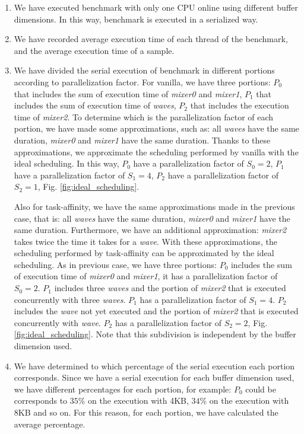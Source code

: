 \begin{enumerate}
\item We have executed benchmark with only one CPU online using different buffer dimensions. In this way, benchmark is executed in a serialized way.
\item We have recorded average execution time of each thread of the benchmark, and the average execution time of a sample.
\item We have divided the serial execution of benchmark in different portions according to parallelization factor. For vanilla, we have three portions: 
$P_{0}$ that includes the sum of execution time of \textit{mixer0} and \textit{mixer1}, $P_{1}$ that includes the sum of execution time of \textit{waves}, 
$P_{2}$ that includes the execution time of \textit{mixer2}. To determine which is the parallelization factor of each portion, we have made some 
approximations, such as: all \textit{waves} have the same duration, \textit{mixer0} and \textit{mixer1} have the same duration. Thanks to these 
approximations, we approximate the scheduling performed by vanilla with the ideal scheduling. In this way, $P_{0}$ have a parallelization factor of 
$S_{0} = 2$, $P_{1}$ have a parallelization factor of $S_{1} = 4$, $P_{2}$ have a parallelization factor of $S_{2} = 1$, Fig. \ref{fig:ideal_scheduling}.

Also for task-affinity, we have the same approximations made in the previous case, that is: all \textit{waves} have the same duration, \textit{mixer0} and 
\textit{mixer1} have the same duration. Furthermore, we have an additional approximation: \textit{mixer2} takes twice the time it takes for a \textit{wave}. 
With these approximations, the scheduling performed by task-affinity can be approximated by the ideal scheduling. As in previous case, we have three 
portions: $P_{0}$ includes the sum of execution time of \textit{mixer0} and \textit{mixer1}, it has a parallelization factor of $S_{0} = 2$. $P_{1}$ 
includes three \textit{waves} and the portion of \textit{mixer2} that is executed concurrently with three \textit{waves}. $P_{1}$ has a parallelization 
factor of $S_{1} = 4$. $P_{2}$ includes the \textit{wave} not yet executed and the portion of \textit{mixer2} that is executed concurrently with 
\textit{wave}. $P_{2}$ has a parallelization factor of $S_{2} = 2$, Fig. \ref{fig:ideal_scheduling}. Note that this subdivision is independent by the 
buffer dimension used.

\item We have determined to which percentage of the serial execution each portion corresponds. Since we have a serial execution for each buffer dimension 
used, we have different percentages for each portion, for example: $P_{0}$ could be corresponds to $35\%$ on the execution with 4KB, $34\%$ on the execution 
with 8KB and so on. For this reason, for each portion, we have calculated the average percentage.

\end{enumerate}
